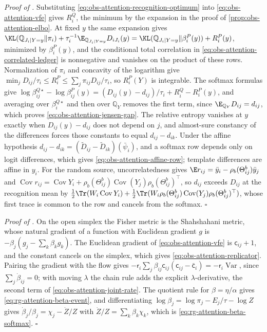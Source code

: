 \noindent\emph{Proof of .}
Substituting \eqref{eq:obs-attention-recognition-optimum} into
\eqref{eq:obs-attention-vfe} gives \(R_i^Q\), the minimum by the expansion in
the proof of \cref{prop:obs-attention-elbo}. At fixed \(y\) the same expansion
gives
\(\KL(\mathbb Q_{J_i\mid Y=y}\Vert\pi_i)+\tau_i^{-1}\E_{\mathbb Q_{J_i\mid Y=y}}D_{iJ_i}(y)
=\KL(\mathbb Q_{J_i\mid Y=y}\Vert\beta_i^P(y))+R_i^P(y)\), minimized by
\(\beta_i^P(y)\), and the conditional total correlation in
\eqref{eq:obs-attention-correlated-ledger} is nonnegative and vanishes on the
product of these rows. Normalization of \(\pi_i\) and concavity of the
logarithm give \(\min_jD_{ij}/\tau_i\leq R_i^P\leq\sum_j\pi_{ij}D_{ij}/\tau_i\),
so \(R_i^P(Y)\) is integrable. The softmax formulas give
\(\log\beta^{Q\star}_{ij}-\log\beta^P_{ij}(y)
=(D_{ij}(y)-d_{ij})/\tau_i+R_i^Q-R_i^P(y)\), and averaging over
\(\beta_i^{Q\star}\) and then over \(\mathbb Q_Y\) removes the first term,
since \(\E_{\mathbb Q_Y}D_{ij}=d_{ij}\), which proves
\eqref{eq:obs-attention-jensen-gap}. The relative entropy vanishes at \(y\)
exactly when \(D_{ij}(y)-d_{ij}\) does not depend on \(j\), and almost-sure
constancy of the differences forces those constants to equal
\(d_{ij}-d_{ik}\). Under the affine hypothesis
\(d_{ij}-d_{ik}=(\widetilde D_{ij}-\widetilde D_{ik})(\bar\psi_i)\), and a
softmax row depends only on logit differences, which gives
\eqref{eq:obs-attention-affine-row}; template differences are affine in
\(y_i\). For the random source, uncorrelatedness gives
\(\E r_{ij}=\bar y_i-\rho_b(\Theta^b_{ij})\bar y_j\) and
\(\operatorname{Cov}r_{ij}=\operatorname{Cov}Y_i
+\rho_b(\Theta^b_{ij})\operatorname{Cov}(Y_j)\rho_b(\Theta^b_{ij})^\top\), so
\(d_{ij}\) exceeds \(D_{ij}\) at the recognition mean by
\(\frac12\Tr(W_i\operatorname{Cov}Y_i)+\frac12\Tr(W_i\rho_b(\Theta^b_{ij})
\operatorname{Cov}(Y_j)\rho_b(\Theta^b_{ij})^\top)\), whose first trace is
common to the row and cancels from the softmax. \(\square\)

\noindent\emph{Proof of .}
On the open simplex the Fisher metric is the Shahshahani metric, whose natural
gradient of a function with Euclidean gradient \(g\) is
\(-\beta_j(g_j-\sum_k\beta_kg_k)\). The Euclidean gradient of
\eqref{eq:obs-attention-vfe} is \(\mathsf c_{ij}+1\), and the constant cancels
on the simplex, which gives \eqref{eq:obs-attention-replicator}. Pairing the
gradient with the flow gives \(-\mathsf r_i\sum_j\beta_{ij}\mathsf c_{ij}
(\mathsf c_{ij}-\bar{\mathsf c}_i)=-\mathsf r_i\operatorname{Var}\), since
\(\sum_j\dot\beta_{ij}=0\); with moving \(\lambda\) the chain rule adds the
explicit \(\lambda\)-derivative, the second term of
\eqref{eq:obs-attention-joint-rate}. The quotient rule for \(\beta=\eta/\alpha\)
gives \eqref{eq:rg-attention-beta-event}, and differentiating
\(\log\beta_j=\log\pi_j-E_j/\tau-\log Z\) gives
\(\dot\beta_j/\beta_j=\chi_j-\dot Z/Z\) with \(\dot Z/Z=\sum_k\beta_k\chi_k\),
which is \eqref{eq:rg-attention-beta-softmax}. \(\square\)

